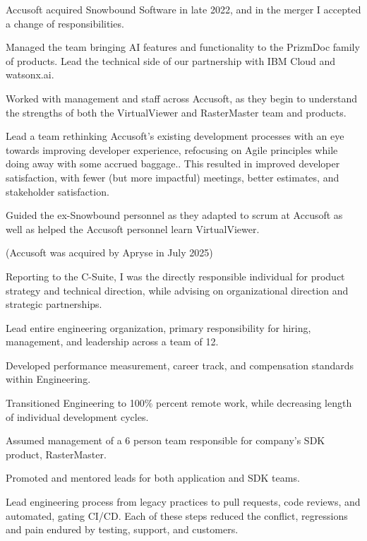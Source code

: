\documentclass[letterpaper,10pt]{article}
\begin{document}
  \begin{resume_list}
    \item Accusoft acquired Snowbound Software in late 2022, and in the
        merger I accepted a change of responsibilities.
    \item Managed the team bringing AI features and functionality to the
        PrizmDoc family of products. Lead the technical side of our
        partnership with IBM Cloud and watsonx.ai.
    \item Worked with management and staff across Accusoft, as they begin to
        understand the strengths of both the VirtualViewer and RasterMaster
        team and products.
    \item Lead a team rethinking Accusoft's existing development processes
        with an eye towards improving developer experience, refocusing on
        Agile principles while doing away with some accrued baggage.. This
        resulted in improved developer satisfaction, with fewer (but more
        impactful) meetings, better estimates, and stakeholder satisfaction.
    \item Guided the ex-Snowbound personnel as they adapted to scrum at
        Accusoft as well as helped the Accusoft personnel learn
        VirtualViewer.
    \item (Accusoft was acquired by Apryse in July 2025)
  \end{resume_list}

  \begin{resume_list}
    \item Reporting to the C-Suite, I was the directly responsible individual for product strategy and technical direction, while advising on organizational direction and strategic partnerships.
    \item Lead entire engineering organization, primary responsibility for hiring, management, and leadership across a team of 12.
    \item Developed performance measurement, career track, and compensation standards within Engineering.
    \item Transitioned Engineering to 100\% percent remote work, while decreasing length of individual development cycles.
  \end{resume_list}
     
  \begin{resume_list}
    \item Assumed management of a 6 person team responsible for company's SDK product, RasterMaster.
    \item Promoted and mentored leads for both application and SDK teams.
    \item Lead engineering process from legacy practices to pull requests, code reviews, and automated, gating CI/CD. Each of these steps reduced the conflict, regressions and pain endured by testing, support, and customers.
  \end{resume_list}
\end{document}
